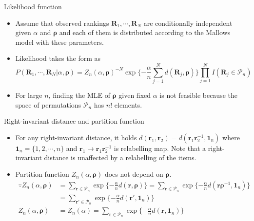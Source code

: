 \documentclass[11pt]{beamer}
\begin{document}
\begin{frame}{Likelihood function}
\begin{itemize}
    \item Assume that observed rankings $\mathbf{R}_1, \cdots, \mathbf{R}_N$ are conditionally independent given $\alpha$ and $\boldsymbol{\rho}$ and each of them is distributed according to the Mallows model with these parameters.
    \item Likelihood takes the form as \begin{equation*}P(\mathbf{R}_1, \cdots, \mathbf{R}_N|\alpha, \boldsymbol{\rho})= Z_n(\alpha, \boldsymbol{\rho})^{-N}\exp\{-\frac{\alpha}{n}\sum_{j=1}^N d(\mathbf{R}_j, \boldsymbol{\rho})\}\prod_{j=1}^N I(\mathbf{R}_j\in \mathcal{P}_n) \end{equation*}
    \item For large $n$, finding the MLE of $\boldsymbol{\rho}$ given fixed $\alpha$ is not feasible because the space of permutations $\mathcal{P}_n$ has $n!$ elements. 
\end{itemize} 
\end{frame}

\begin{frame}{Right-invariant distance and partition function}
\begin{itemize}
    \item For any right-invariant distance, it holds $d(\mathbf{r}_1, \mathbf{r}_2)=d(\mathbf{r}_1 \mathbf{r}_2^{-1}, \mathbf{1}_n)$ where $\mathbf{1}_n=\{1,2,\cdots,n\}$ and $\mathbf{r}_1 \mapsto \mathbf{r}_1 \mathbf{r}_2^{-1}$ is relabelling map. Note that a right-invariant distance is unaffected by a relabelling of the items.
    \item Partition function $Z_n(\alpha, \boldsymbol{\rho})$ does not depend on $\boldsymbol{{\rho}}$. 
    \begin{align*}
    \because Z_n(\alpha, \boldsymbol{\rho}) &= \sum_{\mathbf{r}\in \mathcal{P}_n}\exp\{-\frac{\alpha}{n}d(\mathbf{r},\boldsymbol{\rho})\} = \sum_{\mathbf{r}\in \mathcal{P}_n}\exp\{-\frac{\alpha}{n}d(\mathbf{r} \boldsymbol{\rho}^{-1}, \mathbf{1}_n)\} \\ &=\sum_{\mathbf{r'}\in \mathcal{P}_n}\exp\{-\frac{\alpha}{n}d(\mathbf{r'},\mathbf{1}_n)\} \\ Z_n(\alpha, \boldsymbol{\rho}) &= Z_n(\alpha)=\sum_{\mathbf{r}\in \mathcal{P}_n}\exp\{-\frac{\alpha}{n}d(\mathbf{r},\mathbf{1}_n)\}
    \end{align*}
\end{itemize}
\end{frame}
\end{document}

